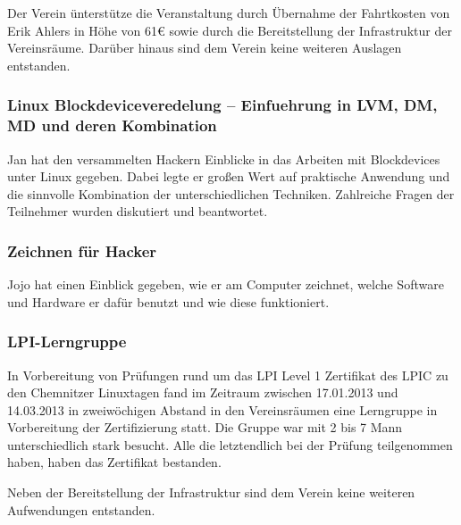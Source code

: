 \documentclass[10pt,DIV16]{scrartcl}
\begin{document}
Der Verein ünterstütze die Veranstaltung durch Übernahme der
Fahrtkosten von Erik Ahlers in Höhe von 61\euro{} sowie durch die
Bereitstellung der Infrastruktur der Vereinsräume. Darüber hinaus
sind dem Verein keine weiteren Auslagen entstanden.

\subsubsection{Linux Blockdeviceveredelung -- Einfuehrung in LVM, DM, MD und deren Kombination}

Jan hat den versammelten Hackern Einblicke in das Arbeiten mit Blockdevices 
unter Linux gegeben. Dabei legte er großen Wert auf praktische Anwendung und 
die sinnvolle Kombination der unterschiedlichen Techniken. Zahlreiche Fragen 
der Teilnehmer wurden diskutiert und beantwortet. 

\subsubsection{Zeichnen für Hacker}

Jojo hat einen Einblick gegeben, wie er am Computer zeichnet, welche Software 
und Hardware er dafür benutzt und wie diese funktioniert. 

\subsubsection{LPI-Lerngruppe}

In Vorbereitung von Prüfungen rund um das LPI Level 1 Zertifikat des
LPIC zu den Chemnitzer Linuxtagen fand im Zeitraum zwischen
17.01.2013 und 14.03.2013 in zweiwöchigen Abstand in den Vereinsräumen
eine Lerngruppe in Vorbereitung der Zertifizierung statt. Die Gruppe
war mit 2 bis 7 Mann unterschiedlich stark besucht. Alle die
letztendlich bei der Prüfung teilgenommen haben, haben das
Zertifikat bestanden.

Neben der Bereitstellung der Infrastruktur sind dem Verein keine
weiteren Aufwendungen entstanden.
\end{document}
